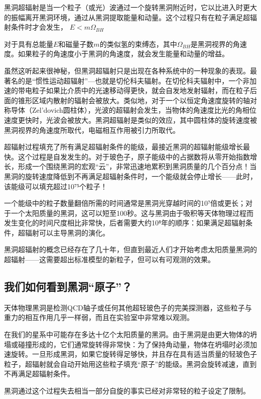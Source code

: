 黑洞超辐射是当一个粒子（或光）波通过一个旋转黑洞附近时，它以比进入时更大的振幅离开黑洞环境，通过从黑洞提取能量和动量。这个过程只有在粒子满足超辐射条件时才会发生，
$E < m\Omega_{BH}$

对于具有总能量$E$和磁量子数$m$的类似氢的束缚态，其中$\Omega_{BH}$是黑洞视界的角速度。如果粒子的角速度小于黑洞的角速度，就会发生能量和动量的增益。

虽然这听起来很神秘，但黑洞超辐射只是出现在各种系统中的一种现象的表现。最著名的是“惯性运动超辐射”—也就是切伦科夫辐射。在切伦科夫辐射中，一个非加速的带电粒子如果比介质中的光速移动得更快，就会自发地发射辐射，而在粒子后面的锥形区域内散射的辐射会被放大。类似地，对于一个以恒定角速度旋转的轴对称导体（Zel’dovich圆柱体），光波的超辐射会发生，当物体的角速度比光的角相位速度更快时，光波会被放大。黑洞超辐射是类似的效应，其中圆柱体的旋转速度被黑洞视界的角速度所取代，电磁相互作用被引力所取代。

超辐射过程填充了所有满足超辐射条件的能级，最接近黑洞的超辐射能级增长最快。这个过程是自发发生的。对于玻色子，原子能级中的占据数将从零开始指数增长，形成一个围绕黑洞的宏观“云”，非常迅速地累积到黑洞质量的几个百分点！当黑洞的旋转速度降低到不再满足超辐射条件时，一个能级就会停止增长——此时，该能级可以填充超过10⁷⁵个粒子！

一个能级中的粒子数量翻倍所需的时间通常是黑洞光穿越时间的10⁷倍或更长；对于一个太阳质量的黑洞，这可以短至100秒。这与黑洞由于吸积等天体物理过程而发生变化的时间尺度相比非常快，后者需要大约10⁸年的顺序：如果满足超辐射条件，超辐射可以主导黑洞的演化。

黑洞超辐射的概念已经存在了几十年，但直到最近人们才开始考虑太阳质量黑洞的超辐射——这需要超出标准模型的新粒子，但可以有可观测的效果。

\subsection{我们如何看到黑洞“原子”？}

天体物理黑洞是检测QCD轴子或任何其他超轻玻色子的完美探测器，这些粒子与重力的相互作用几乎一样弱，而且在实验室中非常难以观测。

在我们的星系中可能存在多达十亿个太阳质量的黑洞。由于黑洞是由更大物体的坍塌或碰撞形成的，它们通常旋转得非常快：为了保持角动量，物体在坍塌时必须加速旋转。一旦形成黑洞，如果它旋转得足够快，并且存在具有适当质量的轻玻色子粒子，超辐射就会自动开始用这些粒子填充“原子”的能级。黑洞会旋转减速，直到不再满足超辐射条件。

黑洞通过这个过程失去相当一部分自旋的事实已经对非常轻的粒子设定了限制。

